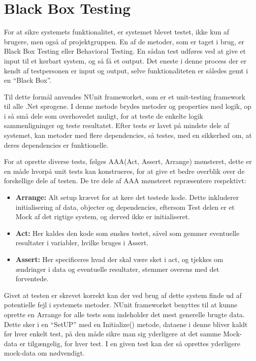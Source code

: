 \section{Black Box Testing}\label{BBtest}
For at sikre systemets funktionalitet, er systemet blevet testet, ikke kun af brugere, men også af projektgruppen.
En af de metoder, som er taget i brug, er Black Box Testing eller Behavioral Testing.
En sådan test udføres ved at give et input til et kørbart system, og så få et output.
Det eneste i denne process der er kendt af testpersonen er input og output, selve funktionaliteten er således gemt i en ``Black Box''. \citep{Black_Box}

Til dette formål anvendes NUnit frameworket, som er et unit-testing framework til alle .Net sprogene.
I denne metode brydes metoder og properties med logik, op i så små dele som overhovedet muligt, for at teste de enkelte logik sammenligninger og teste resultatet.
Efter tests er lavet på mindste dele af systemet, kan metoder med flere dependencies, så testes, med en sikkerhed om, at deres dependencies er funktionelle.
\citep{Unit_Testing}

For at oprette diverse tests, følges AAA(Act, Assert, Arrange) mønsteret, dette er en måde hvorpå unit tests kan konstrueres, for at give et bedre overblik over de forskellige dele af testen.
\citep{Writing_Your_Tests}
De tre dele af AAA mønsteret repræsentere respektivt:
\begin{itemize}
  \item \textbf{Arrange:} Alt setup krævet for at køre det testede kode. Dette inkluderer initialisering af data, objecter og dependencies, eftersom Test delen er et Mock af det rigtige system, og derved ikke er initialiseret.
  \item \textbf{Act:} Her kaldes den kode som ønskes testet, såvel som gemmer eventuelle resultater i variabler, hvilke bruges i Assert.
  \item \textbf{Assert:} Her specificeres hvad der skal være sket i act, og tjekkes om ændringer i data og eventuelle resultater, stemmer overens med det forventede.
\end{itemize}
Givet at testen er skrevet korrekt kan der ved brug af dette system finde ud af potentielle fejl i systemets metoder.
NUnit frameworket benyttes til at kunne oprette en Arrange for alle tests som indeholder det mest generelle brugte data.
Dette sker i en ``SetUP'' med en Initialize() metode, dataene i denne bliver kaldt før hver enkelt test, på den måde sikre man sig yderligere at det samme Mock-data er tilgængelig, for hver test.
I en given test kan der så oprettes yderligere mock-data om nødvendigt.


